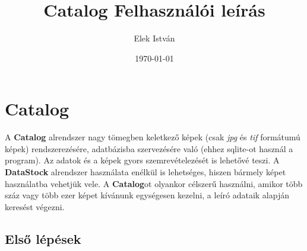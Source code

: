 \documentclass[a4paper,12pt]{article}
\begin{document}
\author{Elek István}

\title{Catalog  \linebreak  \linebreak \small Felhasználói leírás \linebreak \linebreak}


\date{\today}


\setcounter{tocdepth}{3}
\maketitle
\newpage
\tableofcontents
\newpage

\section{Catalog}

A \textbf{Catalog} alrendszer nagy tömegben keletkező képek (csak \textit{jpg} és \textit{tif} formátumú képek) rendszerezésére, adatbázisba szervezésére való (ehhez sqlite-ot használ a program). Az adatok és a képek gyors szemrevételezését is lehetővé teszi. A \textbf{DataStock} alrendszer használata enélkül is lehetséges, hiszen bármely képet használatba vehetjük vele. A \textbf{Catalog}ot olyankor célszerű használni, amikor több száz vagy több ezer képet kívánunk egységesen kezelni, a leíró adataik alapján keresést végezni.

\subsection{Első lépések}
\end{document}
